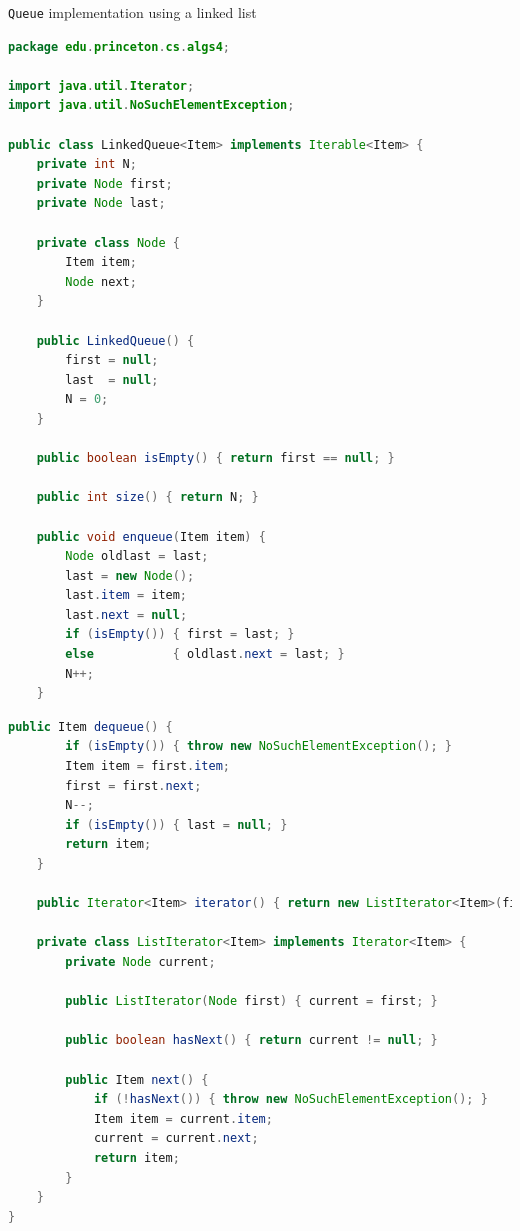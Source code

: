 \documentclass[8pt,a4paper,compress]{beamer}
\begin{document}
\begin{frame}[fragile]
\pause

\lstinline{Queue} implementation using a linked list
\begin{lstlisting}[language=Java]
package edu.princeton.cs.algs4;

import java.util.Iterator;
import java.util.NoSuchElementException;

public class LinkedQueue<Item> implements Iterable<Item> {
    private int N; 
    private Node first; 
    private Node last; 

    private class Node {
        Item item;
        Node next;
    }

    public LinkedQueue() {
        first = null;
        last  = null;
        N = 0;
    }

    public boolean isEmpty() { return first == null; }

    public int size() { return N; }

    public void enqueue(Item item) {
        Node oldlast = last;
        last = new Node();
        last.item = item;
        last.next = null;
        if (isEmpty()) { first = last; }
        else           { oldlast.next = last; }
        N++;
    }
\end{lstlisting}
\end{frame}

\begin{frame}[fragile]
\pause

\begin{lstlisting}[language=Java]
    public Item dequeue() {
        if (isEmpty()) { throw new NoSuchElementException(); }
        Item item = first.item;
        first = first.next;
        N--;
        if (isEmpty()) { last = null; }
        return item;
    }

    public Iterator<Item> iterator() { return new ListIterator<Item>(first); }

    private class ListIterator<Item> implements Iterator<Item> {
        private Node current;

        public ListIterator(Node first) { current = first; }

        public boolean hasNext() { return current != null; }

        public Item next() {
            if (!hasNext()) { throw new NoSuchElementException(); }
            Item item = current.item;
            current = current.next; 
            return item;
        }
    }
}
\end{lstlisting}
\end{frame}
\end{document}
